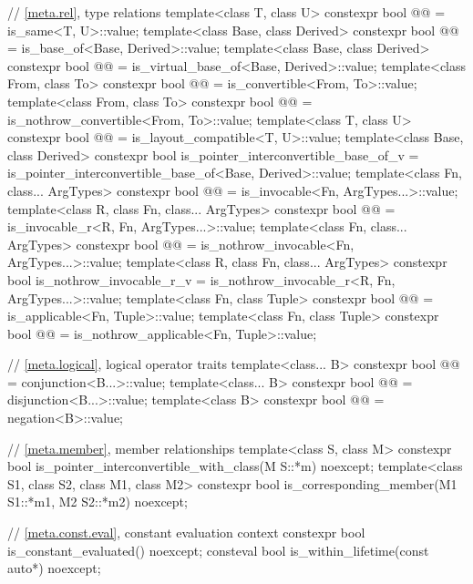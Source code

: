 \begin{codeblock}
{  // \ref{meta.rel}, type relations
  template<class T, class U>
    constexpr bool @@ = is_same<T, U>::value;
  template<class Base, class Derived>
    constexpr bool @@ = is_base_of<Base, Derived>::value;
  template<class Base, class Derived>
    constexpr bool @@ = is_virtual_base_of<Base, Derived>::value;
  template<class From, class To>
    constexpr bool @@ = is_convertible<From, To>::value;
  template<class From, class To>
    constexpr bool @@ = is_nothrow_convertible<From, To>::value;
  template<class T, class U>
    constexpr bool @@ = is_layout_compatible<T, U>::value;
  template<class Base, class Derived>
    constexpr bool is_pointer_interconvertible_base_of_v
      = is_pointer_interconvertible_base_of<Base, Derived>::value;
  template<class Fn, class... ArgTypes>
    constexpr bool @@ = is_invocable<Fn, ArgTypes...>::value;
  template<class R, class Fn, class... ArgTypes>
    constexpr bool @@ = is_invocable_r<R, Fn, ArgTypes...>::value;
  template<class Fn, class... ArgTypes>
    constexpr bool @@ = is_nothrow_invocable<Fn, ArgTypes...>::value;
  template<class R, class Fn, class... ArgTypes>
    constexpr bool is_nothrow_invocable_r_v = is_nothrow_invocable_r<R, Fn, ArgTypes...>::value;
  template<class Fn, class Tuple>
    constexpr bool @@ = is_applicable<Fn, Tuple>::value;
  template<class Fn, class Tuple>
    constexpr bool @@ = is_nothrow_applicable<Fn, Tuple>::value;

  // \ref{meta.logical}, logical operator traits
  template<class... B>
    constexpr bool @@ = conjunction<B...>::value;
  template<class... B>
    constexpr bool @@ = disjunction<B...>::value;
  template<class B>
    constexpr bool @@ = negation<B>::value;

  // \ref{meta.member}, member relationships
  template<class S, class M>
    constexpr bool is_pointer_interconvertible_with_class(M S::*m) noexcept;
  template<class S1, class S2, class M1, class M2>
    constexpr bool is_corresponding_member(M1 S1::*m1, M2 S2::*m2) noexcept;

  // \ref{meta.const.eval}, constant evaluation context
  constexpr bool is_constant_evaluated() noexcept;
  consteval bool is_within_lifetime(const auto*) noexcept;
}
\end{codeblock}

